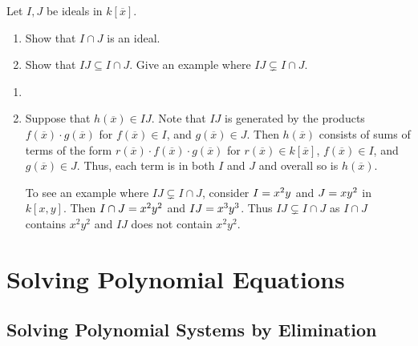 \documentclass[letterpaper, 11pt, oneside]{book}
\begin{document}
\clearpage

\begin{exercise}\label{ex:UAG_1.1.12}
  Let $I, J$ be ideals in $k[\overline{x}]$.
  \begin{enumerate}[label= (\alph*)]
    \item Show that $I \cap J$ is an ideal.
    \item Show that $IJ \subseteq I \cap J$.
          Give an example where $IJ \subsetneq I \cap J$.
  \end{enumerate}
\end{exercise}
\begin{pf}
  \begin{enumerate}[label= (\alph*)]
    \item {}
    \item Suppose that $h(\overline{x}) \in IJ$.
          Note that $IJ$ is generated by the products $f(\overline{x}) \cdot g(\overline{x})$ for $f(\overline{x}) \in I$, and $g(\overline{x}) \in J$.
          Then $h(\overline{x})$ consists of sums of terms of the form $r(\overline{x}) \cdot f(\overline{x}) \cdot g(\overline{x})$ for $r(\overline{x}) \in k[\overline{x}]$, $f(\overline{x}) \in I$, and $g(\overline{x}) \in J$.
          Thus, each term is in both $I$ and $J$ and overall so is $h(\overline{x})$.

          To see an example where $IJ \subsetneq I \cap J$, consider $I = \ideal{x^{2}y}$ and $J = \ideal{xy^{2}}$ in $k[x, y]$.
          Then $I \cap J = \gen{x^{2}y^{2}}$ and $IJ = \gen{x^{3}y^{3}}$.
          Thus $IJ \subsetneq I \cap J$ as $I \cap J$ contains $x^{2}y^{2}$ and $IJ$ does not contain $x^{2}y^{2}$.
  \end{enumerate}
\end{pf}

\chapter{Solving Polynomial Equations}

\section{Solving Polynomial Systems by Elimination}

\begin{exercise}\label{ex:UAG_2.1.1}

\end{exercise}
\end{document}

